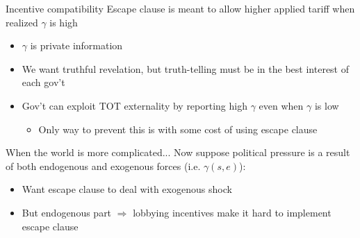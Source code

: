 \documentclass{beamer}
\newcommand{\ga}{\gamma}
\begin{document}
{\begin{frame}{Incentive compatibility}
\pause
Escape clause is meant to allow higher applied tariff when realized $\ga$ is high
\pause
\begin{itemize}[<+->]
	\item $\ga$ is private information
	\item We want truthful revelation, but truth-telling must be in the best interest of each gov't
	\item Gov't can exploit TOT externality by reporting high $\ga$ even when $\ga$ is low
		\begin{itemize}
			\item Only way to prevent this is with some cost of using escape clause
		\end{itemize}
	\end{itemize}
\end{frame}




\begin{frame}{When the world is more complicated...}
Now suppose political pressure is a result of both endogenous and exogenous forces (i.e. $\ga(s,e)$):
\pause
\begin{itemize}[<+->]
	\item Want escape clause to deal with exogenous shock
	\item But endogenous part $\Rightarrow$ lobbying incentives make it hard to implement escape clause
\end{itemize}


\end{frame}}
\end{document}
